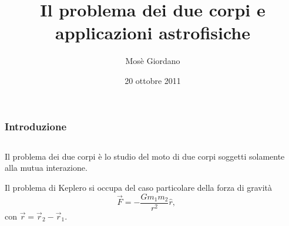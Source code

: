 \documentclass[10pt]{beamer}
\author{Mosè Giordano}
\title{Il problema dei due corpi e applicazioni astrofisiche}
\institute[UniSalento]{Università del Salento}
\date{20 ottobre 2011}
\newcommand{\bm}[1]{\vec{#1}}
\begin{document}
\titlepageframe{}

\begin{frame}
  \frametitle{Introduzione}
  \begin{columns}
    \begin{column}{0.5\columnwidth}
      Il \alert{problema dei due corpi} è lo studio del moto di due corpi
      soggetti solamente alla mutua interazione.

      Il \alert{problema di Keplero} si occupa del caso particolare della forza
      di gravità
      \begin{equation*}
        \bm{F} = -\frac{Gm_{1} m_{2}}{r^{2}}\hat{r},
      \end{equation*}
      con $\bm{r} = \bm{r}_{2} - \bm{r}_{1}.$
    \end{column}
    \begin{column}{0.4\columnwidth}
      \begin{tikzpicture}[tdplot_main_coords,scale=3,font=\footnotesize]
        
      \end{tikzpicture}
    \end{column}
  \end{columns}
\end{frame}
\end{document}
